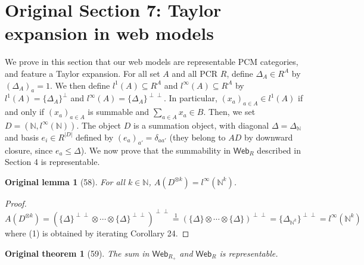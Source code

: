 \documentclass[10pt,a4paper]{article}
\newcommand{\Web}{\mathsf{Web}}
\newtheorem*{originallemma}{Original lemma}
\newtheorem*{originalthm}{Original theorem}
\begin{document}
\section*{Original Section 7: Taylor expansion in web models}
We prove in this section that our web models are representable PCM categories, and feature a Taylor expansion. For all set $A$ and all PCR $R$, define $\Delta_A\in R^A$ by $(\Delta_A)_a=1$. We then define $l^1(A)\subseteq R^A$ and $l^\infty(A)\subseteq R^A$ by $l^1(A)=\{\Delta_A\}^\perp$ and $l^\infty(A)=\{\Delta_A\}^{\perp\perp}$. In particular, $(x_a)_{a\in A}\in l^1(A)$ if and only if $(x_a)_{a\in A}$ is summable and $\sum_{a\in A}x_a\in B$. Then, we set $D=(\mathbb N,l^\infty(\mathbb N))$.
The object $D$ is a summation object, with diagonal $\Delta=\Delta_{\mathbb N}$ and basis $e_i\in R^{|D|}$ defined by $(e_a)_{a'}=\delta_{aa'}$ (they belong to $AD$ by downward closure, since $e_a\leq\Delta$). We now prove that the summability in $\Web_R$ described in Section 4 is representable.
\begin{originallemma}[58] For all $k\in\mathbb N$, $A(D^{\otimes k})=l^\infty(\mathbb N^k)$.\end{originallemma}
\begin{proof}$A(D^{\otimes k})=(\{\Delta\}^{\perp\perp}\otimes\cdots\otimes\{\Delta\}^{\perp\perp})^{\perp\perp}\mathrel{\stackrel{1}{=}}(\{\Delta\}\otimes\cdots\otimes\{\Delta\})^{\perp\perp}=\{\Delta_{\mathbb N^k}\}^{\perp\perp}=l^\infty(\mathbb N^k)$ where (1) is obtained by iterating Corollary 24.\end{proof}

\begin{originalthm}[59] The sum in $\Web_{R_+}$ and $\Web_R$ is representable.\end{originalthm}
\end{document}
